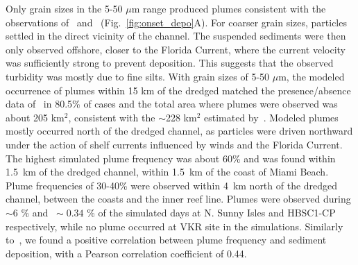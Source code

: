 \documentclass[preprint,12pt,authoryear]{elsarticle}
\begin{document}
Only grain sizes in the 5-50 $\mu$m range produced plumes consistent with the observations of~\cite{barnes2015sediment} and~\cite{cunning2019extensive} (Fig.~\ref{fig:onset_depo}A). For coarser grain sizes, particles settled in the direct vicinity of the channel. The suspended sediments were then only observed offshore, closer to the Florida Current, where the current velocity was sufficiently strong to prevent deposition. This suggests that the observed turbidity was mostly due to fine silts. With grain sizes of 5-50 $\mu$m, the modeled occurrence of plumes  within 15 km of the dredged matched the presence/absence data of~\cite{cunning2019extensive} in 80.5\% of cases and the total area where plumes were observed was about 205 km$^2$, consistent with the $\sim$228 km$^2$ estimated by~\cite{barnes2015sediment}. Modeled plumes mostly occurred north of the dredged channel, as particles were driven northward under the action of shelf currents influenced by winds and the Florida Current. The highest simulated plume frequency was about 60\% and was found within 1.5~km of the dredged channel, within 1.5~km of the coast of Miami Beach. Plume frequencies of 30-40\% were observed within 4~km north of the dredged channel, between the coasts and the inner reef line. Plumes were observed during  $\sim6$ \% and $~\sim0.34$ \% of the simulated days at N. Sunny Isles and HBSC1-CP respectively, while no plume occurred at VKR site in the simulations. Similarly to~\cite{cunning2019extensive}, we found a positive correlation between plume frequency and sediment deposition, with a Pearson correlation coefficient of 0.44.

\end{document}
